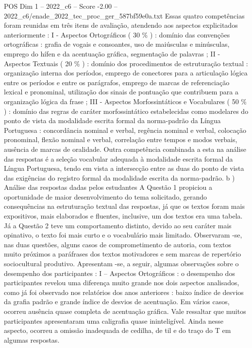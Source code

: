 \begin{textsample}{POS Dim 1 – 2022\_c6 – Score -2.00 – 2022\_c6/enade\_2022\_tec\_proc\_ger\_587bf59e0a.txt}
Essas quatro competências foram reunidas em três itens de avaliação, atendendo aos aspectos explicitados anteriormente : I - Aspectos Ortográficos ( 30 \% ) : domínio das convenções ortográficas : grafia de vogais e consoantes, uso de maiúsculas e minúsculas, emprego do hífen e da acentuação gráfica, segmentação de palavras ; II - Aspectos Textuais ( 20 \% ) : domínio dos procedimentos de estruturação textual : organização interna dos períodos, emprego de conectores para a articulação lógica entre os períodos e entre os parágrafos, emprego de marcas de referenciação lexical e pronominal, utilização dos sinais de pontuação que contribuem para a organização lógica da frase ; III - Aspectos Morfossintáticos e Vocabulares ( 50 \% ) : domínio das regras de caráter morfossintático estabelecidas como modelares do ponto de vista da modalidade escrita formal da norma-padrão da Língua Portuguesa : concordância nominal e verbal, regência nominal e verbal, colocação pronominal, flexão nominal e verbal, correlação entre tempos e modos verbais, ausência de marcas de oralidade.
Outra competência combinada a esta na análise das respostas é a seleção vocabular adequada à modalidade escrita formal da Língua Portuguesa, tendo em vista a intersecção entre as duas do ponto de vista das exigências do registro formal da modalidade escrita da norma-padrão. b ) Análise das respostas dadas pelos estudantes A Questão 1 propiciou a oportunidade de maior desenvolvimento do tema solicitado, gerando consequências na estruturação textual das respostas, já que os textos foram mais expositivos, mais elaborados e fluentes, inclusive, um dos textos era uma tabela.
Já a Questão 2 teve um comportamento distinto, devido ao seu caráter mais opinativo, o texto foi mais curto e o vocabulário mais limitado.
Observaram -se, nas duas questões, alguns casos de comprometimento de autoria, com textos muito próximos a paráfrases dos textos motivadores e sem marcas de repertório sociocultural produtivo.
Apresentam -se, a seguir, algumas observações sobre o desempenho dos participantes : I – Aspectos Ortográficos : o desempenho dos participantes revelou uma diferença muito grande nos dois aspectos analisados, como já foi observado nos relatórios dos anos anteriores : baixo índice de desvios da grafia padrão e grande índice de desvios de acentuação.
Em vários casos, ocorreu ausência quase completa de acentuação gráfica.
Vale ressaltar que muitos participantes apresentaram uma caligrafia quase ininteligível.
Ainda nesse aspecto, ocorreu a omissão inadequada de cedilha, de til e do traço do T em algumas respostas.

\end{textsample}
